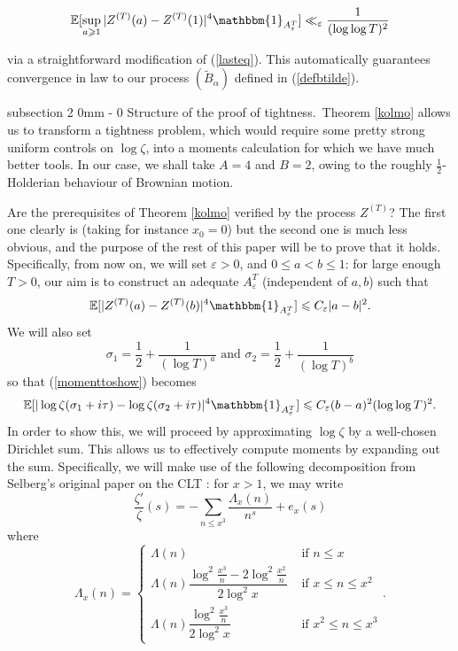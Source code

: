 \documentclass{article}
\makeatletter
\newcommand{\1}{\mathds{1}}
\numberwithin{equation}{section}
\newcommand{\eps}{\varepsilon}
\renewcommand{\leq}{\leqslant}
\renewcommand{\geq}{\geqslant}
\newcommand{\E}{\mathbb{E}}
\theoremstyle{plain} %
\renewcommand{\subsection}{\@startsection
{subsection}%
{2}%
{0mm}%
{-\baselineskip}%
{0 \baselineskip}%
{\normalfont\bf\itshape}} %
\newcommand{\hf}{\frac{1}{2}}
\makeatother
\begin{document}
\begin{equation}
    \E[\sup_{a \geq 1} |Z^{(T)}(a) - Z^{(T)}(1)|^4 \mathbbm{1}_{A_\eps^T}] \ll_\eps \frac{1}{(\log \log T)^2}
\end{equation}

via a straightforward modification of (\ref{lasteq}). This automatically guarantees convergence in law to our process $(\tilde{B}_\alpha)$ defined in (\ref{defbtilde}).


\subsection{Structure of the proof of tightness}.\ 
Theorem \ref{kolmo}  allows us to transform a tightness problem, which would require some pretty strong uniform controls on $\log \zeta$, into a moments calculation for which we have much better tools. In our case, we shall take $A = 4$ and $B=2$, owing to the roughly $\hf$-Holderian behaviour of Brownian motion.

Are the prerequisites of Theorem \ref{kolmo} verified by the process $Z^{(T)}$? The first one clearly is (taking for instance $x_0 = 0$) but the second one is much less obvious, and the purpose of the rest of this paper will be to prove that it holds. Specifically, from now on, we will set $\eps > 0$, and $0 \leq a < b \leq 1$: for large enough $T > 0$, our aim is to construct an adequate $A_\eps^T$ (independent of $a, b$) such that
\begin{equation}
\label{momenttoshow}
    \E[|Z^{(T)}(a) - Z^{(T)}(b)|^4 \mathbbm{1}_{A_\eps^T}] \leq C_\eps |a - b|^2.
\end{equation}
We will also set
\begin{equation}
    \sigma_1 = \hf + \frac{1}{(\log T)^a} \text{ and } \sigma_2 = \hf + \dfrac{1}{(\log T)^b}
\end{equation}
so that (\ref{momenttoshow}) becomes
\begin{equation}
    \E [|\log \zeta(\sigma_1 + i \tau) - \log \zeta(\sigma_2 + i \tau)|^4 \mathbbm{1}_{A_\eps^T}] \leq C_\eps(b - a)^2(\log \log T)^2.
\end{equation}
In order to show this, we will proceed by approximating $\log \zeta$ by a well-chosen Dirichlet sum. This allows us to effectively compute moments by expanding out the sum. Specifically, we will make use of the following decomposition from Selberg's original paper on the CLT \cite{Sel1946}: for $x > 1$, we may write
\begin{equation}
    \dfrac{\zeta'}{\zeta}(s) = -\sum_{n \leq x^3} \frac{\Lambda_x(n)}{n^{s}} +  e_x(s)
\end{equation} 
where 
\begin{equation}
    \Lambda_x(n) = \begin{cases}
    \Lambda(n) & \text{ if } n \leq x \\
    \Lambda(n) \dfrac{\log^2 \frac{x^3}{n} - 2 \log^2 \frac{x^2}{n}}{2 \log^2 x} & \text{ if } x \leq n \leq x^2 \\
    \Lambda(n) \dfrac{\log^2 \frac{x^3}{n}}{2 \log^2 x} & \text{ if } x^2 \leq n \leq  x^3 
\end{cases}. 
\end{equation}
\end{document}
